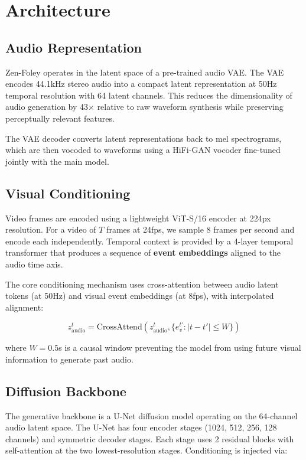 \documentclass[11pt,a4paper]{article}
\begin{document}
\section{Architecture}

\subsection{Audio Representation}

Zen-Foley operates in the latent space of a pre-trained audio VAE. The VAE encodes 44.1kHz
stereo audio into a compact latent representation at 50Hz temporal resolution with 64
latent channels. This reduces the dimensionality of audio generation by 43$\times$ relative
to raw waveform synthesis while preserving perceptually relevant features.

The VAE decoder converts latent representations back to mel spectrograms, which are then
vocoded to waveforms using a HiFi-GAN vocoder fine-tuned jointly with the main model.

\subsection{Visual Conditioning}

Video frames are encoded using a lightweight ViT-S/16 encoder at 224px resolution. For a
video of $T$ frames at 24fps, we sample 8 frames per second and encode each independently.
Temporal context is provided by a 4-layer temporal transformer that produces a sequence of
\textbf{event embeddings} aligned to the audio time axis.

The core conditioning mechanism uses cross-attention between audio latent tokens (at 50Hz)
and visual event embeddings (at 8fps), with interpolated alignment:

\begin{equation}
    z_{\text{audio}}^t = \text{CrossAttend}(z_{\text{audio}}^t, \{e_v^{t'} : |t - t'| \leq W\})
\end{equation}

where $W = 0.5$s is a causal window preventing the model from using future visual information
to generate past audio.

\subsection{Diffusion Backbone}

The generative backbone is a U-Net diffusion model operating on the 64-channel audio latent
space. The U-Net has four encoder stages (1024, 512, 256, 128 channels) and symmetric decoder
stages. Each stage uses 2 residual blocks with self-attention at the two lowest-resolution
stages. Conditioning is injected via:
\end{document}
